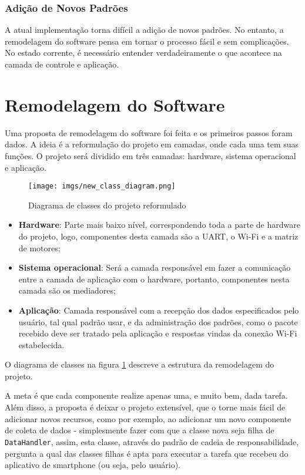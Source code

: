 \documentclass{sig-alternate-05-2015}
\begin{document}
        \subsubsection{Adição de Novos Padrões}
            A atual implementação torna difícil a adição de novos padrões. No
            entanto, a remodelagem do software pensa em tornar o processo fácil
            e sem complicações. No estado corrente, é necessário entender
            verdadeiramente o que acontece na camada de controle e aplicação.

\section{Remodelagem do Software}
    Uma proposta de remodelagem do software foi feita e os primeiros passos
    foram dados. A ideia é a reformulação do projeto em camadas, onde cada uma
    tem suas funções. O projeto será dividido em três camadas: hardware,
    sistema operacional e aplicação.
    
    \begin{figure}[h!]
        \centering
        \texttt{[image: imgs/new\_class\_diagram.png]}
        \caption{Diagrama de classes do projeto reformulado}
        \label{fig:classDiagram}
    \end{figure}
    
    \begin{itemize}
        \item \textbf{Hardware}: Parte mais baixo nível, correspondendo toda a
            parte de hardware do projeto, logo, componentes desta camada são a
            UART, o Wi-Fi e a matriz de motores;
        \item \textbf{Sistema operacional}: Será a camada responsável em fazer
            a comunicação entre a camada de aplicação com o hardware, portanto,
            componentes nesta camada são os mediadores;
        \item \textbf{Aplicação}: Camada responsável com a recepção dos dados
            especificados pelo usuário, tal qual padrão usar, e da
            administração dos padrões, como o pacote recebido deve ser tratado
            pela aplicação e respostas vindas da conexão Wi-Fi estabelecida.
    \end{itemize}
    
    O diagrama de classes na figura \ref{fig:classDiagram} descreve a estrutura
    da remodelagem do projeto.

    A meta é que cada componente realize apenas uma, e muito bem, dada tarefa.
    Além disso, a proposta é deixar o projeto extensível, que o torne mais
    fácil de adicionar novos recursos, como por exemplo, ao adicionar um novo
    componente de coleta de dados - simplesmente fazer com que a classe nova
    seja filha de \texttt{DataHandler}, assim, esta classe, através do padrão
    de cadeia de responsabilidade, pergunta a qual das classes filhas é apta
    para executar a tarefa que recebeu do aplicativo de smartphone (ou seja,
    pelo usuário).

\nocite{niosHandbook}


\end{document}
